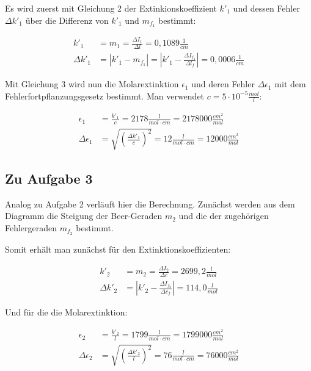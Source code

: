 \documentclass{article}
\begin{document}
Es wird zuerst mit Gleichung 2 der Extinkionskoeffizient $k'_1$ und dessen Fehler $\Delta k'_1$ über die Differenz von $k'_1$ und $m_{f_1}$ bestimmt:

\begin{equation}
    \begin{split}
        k'_1 &= m_1 = \frac{\Delta I_1}{\Delta l} = 0,1089 \frac{1}{cm} \\
        \Delta k'_1 &= \left| k'_1 - m_{f_1} \right| = \left| k'_1 - \frac{\Delta I_{f_1}}{\Delta l_{f}} \right| = 0,0006 \frac{1}{cm}
    \end{split}
\end{equation}

Mit Gleichung 3 wird nun die Molarextinktion $\epsilon_1$ und deren Fehler $\Delta \epsilon_1$ mit dem Fehlerfortpflanzungsgesetz bestimmt. Man verwendet $c = 5 \cdot 10^{-5} \frac{mol}{l}$:

\begin{equation}
    \begin{split}
        \epsilon_1 &= \frac{k'_1}{c} = 2178 \frac{l}{mol \cdot cm} = 2178000 \frac{cm^2}{mol} \\
        \Delta \epsilon_1 &= \sqrt{\left( \frac{\Delta k'_1}{{c}} \right)^2} = 12 \frac{l}{mol \cdot cm} = 12000 \frac{cm^2}{mol}
    \end{split}
\end{equation}

\subsection{Zu Aufgabe 3}

Analog zu Aufgabe 2 verläuft hier die Berechnung. Zunächst werden aus dem Diagramm die Steigung der Beer-Geraden $m_2$ und die der zugehörigen Fehlergeraden $m_{f_2}$ bestimmt.

Somit erhält man zunächst für den Extinktionskoeffizienten:

\begin{equation}
    \begin{split}
        k'_2 &= m_2 = \frac{\Delta I_2}{\Delta c} = 2699,2 \frac{l}{mol} \\
        \Delta k'_2 &= \left| k'_2 - \frac{\Delta I_{f_2}}{\Delta c_f} \right| = 114,0 \frac{l}{mol}
    \end{split}
\end{equation}

Und für die die Molarextinktion:

\begin{equation}
    \begin{split}
        \epsilon_2 &= \frac{k'_2}{l} = 1799 \frac{l}{mol \cdot cm} = 1799000 \frac{cm^2}{mol} \\
        \Delta \epsilon_2 &= \sqrt{\left( \frac{\Delta k'_2}{l} \right)^2} = 76 \frac{l}{mol \cdot cm} = 76000 \frac{cm^2}{mol}
    \end{split}
\end{equation}
\end{document}
